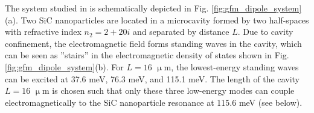 



The system studied in  is schematically depicted in Fig. \ref{fig:gfm_dipole_system}(a). Two SiC nanoparticles are located in a microcavity formed by two half-spaces with refractive index $n_2=2+20i$ and separated by distance $L$. Due to cavity confinement, the electromagnetic field forms standing waves in the cavity, which can be seen as ''stairs'' in the electromagnetic density of states shown in Fig. \ref{fig:gfm_dipole_system}(b). For $L=16$ $\upmu$m, the lowest-energy standing waves can be excited at 37.6 meV, 76.3 meV, and 115.1 meV. The length of the cavity $L=16$ $\upmu$m is chosen such that only these three low-energy modes can couple electromagnetically to the SiC nanoparticle resonance at 115.6 meV (see below). %

